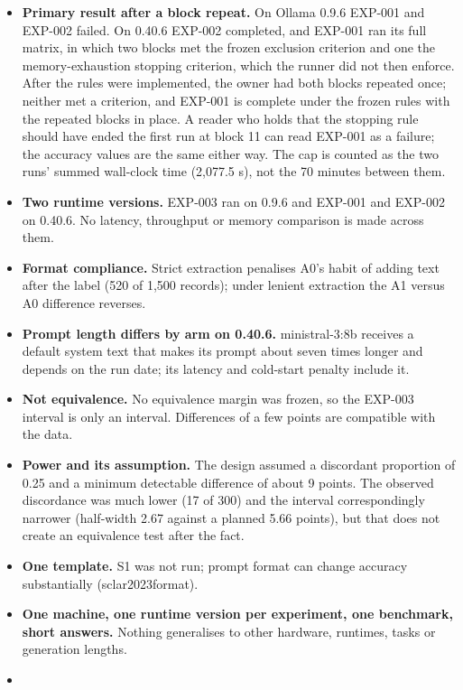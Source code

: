 \documentclass[
]{article}
\providecommand{\tightlist}{%
  \setlength{\itemsep}{0pt}\setlength{\parskip}{0pt}}
\begin{document}
\begin{itemize}
\tightlist
\item
  \textbf{Primary result after a block repeat.} On Ollama 0.9.6 EXP-001
  and EXP-002 failed. On 0.40.6 EXP-002 completed, and EXP-001 ran its
  full matrix, in which two blocks met the frozen exclusion criterion
  and one the memory-exhaustion stopping criterion, which the runner did
  not then enforce. After the rules were implemented, the owner had both
  blocks repeated once; neither met a criterion, and EXP-001 is complete
  under the frozen rules with the repeated blocks in place. A reader who
  holds that the stopping rule should have ended the first run at block
  11 can read EXP-001 as a failure; the accuracy values are the same
  either way. The cap is counted as the two runs' summed wall-clock time
  (2,077.5 s), not the 70 minutes between them.
\item
  \textbf{Two runtime versions.} EXP-003 ran on 0.9.6 and EXP-001 and
  EXP-002 on 0.40.6. No latency, throughput or memory comparison is made
  across them.
\item
  \textbf{Format compliance.} Strict extraction penalises A0's habit of
  adding text after the label (520 of 1,500 records); under lenient
  extraction the A1 versus A0 difference reverses.
\item
  \textbf{Prompt length differs by arm on 0.40.6.} ministral-3:8b
  receives a default system text that makes its prompt about seven times
  longer and depends on the run date; its latency and cold-start penalty
  include it.
\item
  \textbf{Not equivalence.} No equivalence margin was frozen, so the
  EXP-003 interval is only an interval. Differences of a few points are
  compatible with the data.
\item
  \textbf{Power and its assumption.} The design assumed a discordant
  proportion of 0.25 and a minimum detectable difference of about 9
  points. The observed discordance was much lower (17 of 300) and the
  interval correspondingly narrower (half-width 2.67 against a planned
  5.66 points), but that does not create an equivalence test after the
  fact.
\item
  \textbf{One template.} S1 was not run; prompt format can change
  accuracy substantially (sclar2023format).
\item
  \textbf{One machine, one runtime version per experiment, one
  benchmark, short answers.} Nothing generalises to other hardware,
  runtimes, tasks or generation lengths.
\item

\end{itemize}
\end{document}

